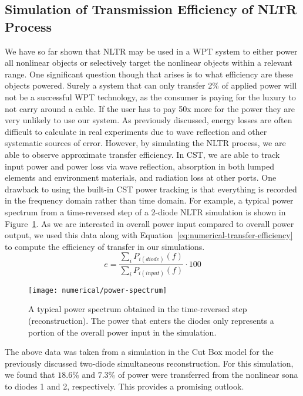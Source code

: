 \subsection{Simulation of Transmission Efficiency of NLTR Process}

We have so far shown that NLTR may be used in a WPT system to either power all nonlinear objects or selectively target the nonlinear objects within a relevant range. One significant question though that arises is to what efficiency are these objects powered. Surely a system that can only transfer 2\% of applied power will not be a successful WPT technology, as the consumer is paying for the luxury to not carry around a cable. If the user has to pay 50x more for the power they are very unlikely to use our system.
As previously discussed, energy losses are often difficult to calculate in real experiments due to wave reflection and other systematic sources of error. However, by simulating the NLTR process, we are able to observe approximate transfer efficiency. In CST, we are able to track input power and power loss via wave reflection, absorption in both lumped elements and environment materials, and radiation loss at other ports. One drawback to using the built-in CST power tracking is that everything is recorded in the frequency domain rather than time domain. For example, a typical power spectrum from a time-reversed step of a 2-diode NLTR simulation is shown in Figure~\ref{fig:numerical-power-spectrum}. As we are interested in overall power input compared to overall power output, we used this data along with Equation~\ref{eq:numerical-transfer-efficiency} to compute the efficiency of transfer in our simulations.
\begin{equation}
e = \frac{\sum_{i}P_{i(diode)}(f)}{\sum_{i}P_{i(input)}(f)} \cdot 100
\label{eq:numerical-transfer-efficiency}
\end{equation}

\begin{figure}[t]
\centering
\texttt{[image: numerical/power-spectrum]}
\caption[Example transfer efficiency for a two-diode simultaneous reconstruction]{A typical power spectrum obtained in the time-reversed step (reconstruction). The power that enters the diodes only represents a portion of the overall power input in the simulation.}
\label{fig:numerical-power-spectrum}
\end{figure}

The above data was taken from a simulation in the Cut Box model for the previously discussed two-diode simultaneous reconstruction. For this simulation, we found that $18.6$\% and $7.3$\% of power were transferred from the nonlinear sona to diodes 1 and 2, respectively.  This provides a promising outlook.

